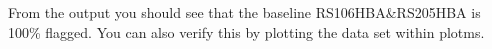From the output you should see that the baseline RS106HBA\&RS205HBA is 100\% flagged. You can also verify this by plotting the data set within plotms.












